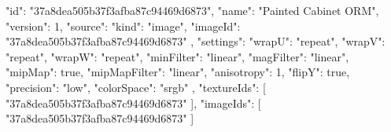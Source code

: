 {
  "id": "37a8dea505b37f3afba87c94469d6873",
  "name": "Painted Cabinet ORM",
  "version": 1,
  "source": {
    "kind": "image",
    "imageId": "37a8dea505b37f3afba87c94469d6873"
  },
  "settings": {
    "wrapU": "repeat",
    "wrapV": "repeat",
    "wrapW": "repeat",
    "minFilter": "linear",
    "magFilter": "linear",
    "mipMap": true,
    "mipMapFilter": "linear",
    "anisotropy": 1,
    "flipY": true,
    "precision": "low",
    "colorSpace": "srgb"
  },
  "textureIds": [
    "37a8dea505b37f3afba87c94469d6873"
  ],
  "imageIds": [
    "37a8dea505b37f3afba87c94469d6873"
  ]
}
